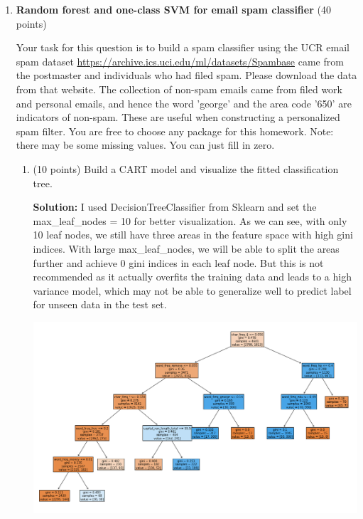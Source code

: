 \documentclass[twoside,10pt]{article}
\begin{document}
\begin{enumerate}
\begin{enumerate}
\end{enumerate}



\clearpage

\item {\bf Random forest and one-class SVM for email spam classifier} (40 points)

Your task for this question is to build a spam classifier using the UCR email spam dataset \url{https://archive.ics.uci.edu/ml/datasets/Spambase} came from the postmaster and individuals who had filed spam. Please download the data from that website. The collection of non-spam emails came from filed work and personal emails, and hence the word \textsf{'george'} and the area code \textsf{'650'} are indicators of non-spam. These are useful when constructing a personalized spam filter. You are free to choose any package for this homework. Note: there may be some missing values. You can just fill in zero.

\begin{enumerate}

\item (10 points) Build a CART model and visualize the fitted classification tree.
\begin{tcolorbox}
\textbf{Solution:} I used DecisionTreeClassifier from Sklearn and set the max\_leaf\_nodes = 10 for better visualization. As we can see, with only 10 leaf nodes, we still have three areas in the feature space with high gini indices. With large max\_leaf\_nodes, we will be able to split the areas further and achieve 0 gini indices in each leaf node. But this is not recommended as it actually overfits the training data and leads to a high variance model, which may not be able to generalize well to predict label for unseen data in the test set. 
\begin{center}
\includegraphics[width =1 \textwidth]{images/tree.png} 
\end{center}
\end{tcolorbox}


\end{enumerate}
\end{enumerate}
\end{document}
